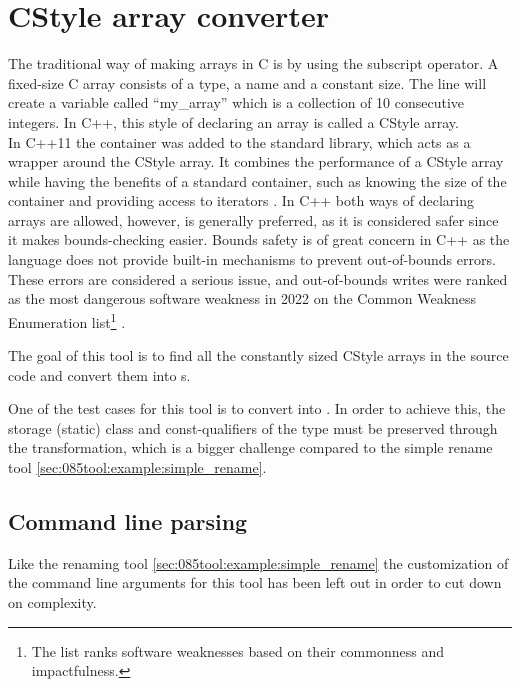 
\section{CStyle array converter}\label{sec:045tool:c_style_array}

The traditional way of making arrays in C is by using the subscript operator. A fixed-size C array consists of a type, a name and a constant size. The line  will create a variable called ``my\_array'' which is a collection of 10 consecutive integers.
In C++, this style of declaring an array is called a CStyle array.\\
In C++11 the container  was added to the standard library, which acts as a wrapper around the CStyle array.
It combines the performance of a CStyle array while having the benefits of a standard container, such as knowing the size of the container and providing access to iterators \cite{cppreferenceStdArrayCppreference}.
In C++ both ways of declaring arrays are allowed, however,  is generally preferred, as it is considered safer since it makes bounds-checking easier.
Bounds safety is of great concern in C++ as the language does not provide built-in mechanisms to prevent out-of-bounds errors.
These errors are considered a serious issue, and out-of-bounds writes were ranked as the most dangerous software weakness in 2022 on the Common Weakness Enumeration list\footnote{The list ranks software weaknesses based on their commonness and impactfulness.} \cite{mitreCWE2022CWE}.

The goal of this tool is to find all the constantly sized CStyle arrays in the source code and convert them into s.

One of the test cases for this tool is to convert  into . In order to achieve this, the storage (static) class and const-qualifiers of the type must be preserved through the transformation, which is a bigger challenge compared to the simple rename tool \cref{sec:085tool:example:simple_rename}.

\subsection{Command line parsing}

Like the renaming tool \cref{sec:085tool:example:simple_rename} the customization of the command line arguments for this tool has been left out in order to cut down on complexity.

